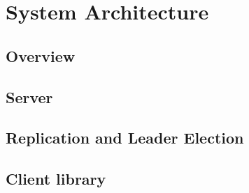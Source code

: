 \section{System Architecture}
\label{section:normal}

\subsection{Overview}


\subsection{Server}


\subsection{Replication and Leader Election}


\subsection{Client library}


